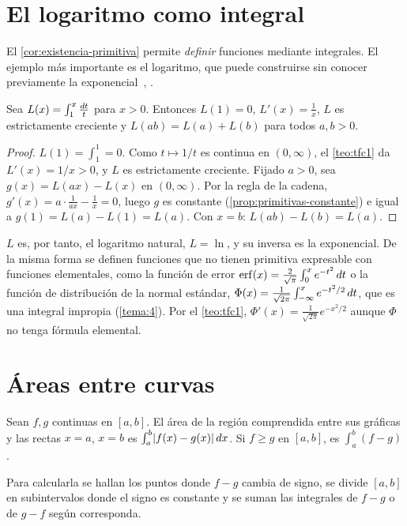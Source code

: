 \section{El logaritmo como integral}

El \cref{cor:existencia-primitiva} permite \emph{definir} funciones mediante integrales. El ejemplo más importante es el logaritmo, que puede construirse sin conocer previamente la exponencial~\cite[cap.~18]{spivak}, \cite[cap.~6]{apostol}.

\begin{proposicion}\label{prop:logaritmo}
Sea $L(x)=\int_1^x\frac{\mathop{}\!d t}{t}$ para $x>0$. Entonces $L(1)=0$, $L'(x)=\frac1x$, $L$ es estrictamente creciente y $L(ab)=L(a)+L(b)$ para todos $a,b>0$.
\end{proposicion}

\begin{proof}
$L(1)=\int_1^1=0$. Como $t\mapsto1/t$ es continua en $(0,\infty)$, el \cref{teo:tfc1} da $L'(x)=1/x>0$, y $L$ es estrictamente creciente. Fijado $a>0$, sea $g(x)=L(ax)-L(x)$ en $(0,\infty)$. Por la regla de la cadena, $g'(x)=a\cdot\frac{1}{ax}-\frac1x=0$, luego $g$ es constante (\cref{prop:primitivas-constante}) e igual a $g(1)=L(a)-L(1)=L(a)$. Con $x=b$: $L(ab)-L(b)=L(a)$.
\end{proof}

$L$ es, por tanto, el logaritmo natural, $L=\ln$, y su inversa es la exponencial. De la misma forma se definen funciones que no tienen primitiva expresable con funciones elementales, como la función de error $\operatorname{erf}(x)=\frac{2}{\sqrt\pi}\int_0^x e^{-t^{2}}\mathop{}\!d t$ o la función de distribución de la normal estándar, $\Phi(x)=\frac{1}{\sqrt{2\pi}}\int_{-\infty}^{x}e^{-t^{2}/2}\mathop{}\!d t$, que es una integral impropia (\cref{tema:4}). Por el \cref{teo:tfc1}, $\Phi'(x)=\frac{1}{\sqrt{2\pi}}e^{-x^{2}/2}$ aunque $\Phi$ no tenga fórmula elemental.

\section{Áreas entre curvas}

\begin{definicion}\label{def:area}
Sean $f,g$ continuas en $[a,b]$. El área de la región comprendida entre sus gráficas y las rectas $x=a$, $x=b$ es $\int_a^b\lvert f(x)-g(x)\rvert\mathop{}\!d x$. Si $f\ge g$ en $[a,b]$, es $\int_a^b(f-g)$.
\end{definicion}

Para calcularla se hallan los puntos donde $f-g$ cambia de signo, se divide $[a,b]$ en subintervalos donde el signo es constante y se suman las integrales de $f-g$ o de $g-f$ según corresponda.

